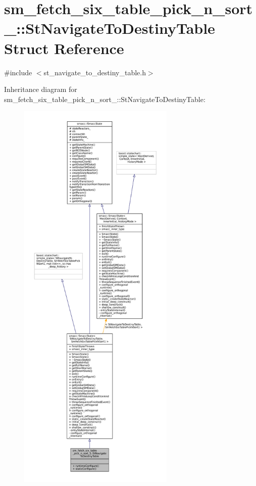 \hypertarget{structsm__fetch__six__table__pick__n__sort__1_1_1StNavigateToDestinyTable}{}\section{sm\+\_\+fetch\+\_\+six\+\_\+table\+\_\+pick\+\_\+n\+\_\+sort\+\_\+:\+:St\+Navigate\+To\+Destiny\+Table Struct Reference}
\label{structsm__fetch__six__table__pick__n__sort__1_1_1StNavigateToDestinyTable}


{\ttfamily \#include $<$st\+\_\+navigate\+\_\+to\+\_\+destiny\+\_\+table.\+h$>$}



Inheritance diagram for sm\+\_\+fetch\+\_\+six\+\_\+table\+\_\+pick\+\_\+n\+\_\+sort\+\_\+:\+:St\+Navigate\+To\+Destiny\+Table\+:
\nopagebreak
\begin{figure}[H]
\begin{center}
\leavevmode
\includegraphics[height=550pt]{structsm__fetch__six__table__pick__n__sort__1_1_1StNavigateToDestinyTable__inherit__graph}
\end{center}
\end{figure}


